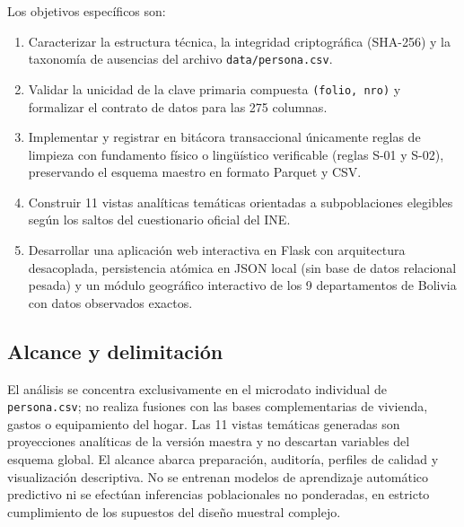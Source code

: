 Los objetivos específicos son:
\begin{enumerate}[leftmargin=0.5in]
  \item Caracterizar la estructura técnica, la integridad criptográfica (SHA-256) y la taxonomía de ausencias del archivo \texttt{data/persona.csv}.
  \item Validar la unicidad de la clave primaria compuesta \texttt{(folio, nro)} y formalizar el contrato de datos para las 275 columnas.
  \item Implementar y registrar en bitácora transaccional únicamente reglas de limpieza con fundamento físico o lingüístico verificable (reglas S-01 y S-02), preservando el esquema maestro en formato Parquet y CSV.
  \item Construir 11 vistas analíticas temáticas orientadas a subpoblaciones elegibles según los saltos del cuestionario oficial del INE.
  \item Desarrollar una aplicación web interactiva en Flask con arquitectura desacoplada, persistencia atómica en JSON local (sin base de datos relacional pesada) y un módulo geográfico interactivo de los 9 departamentos de Bolivia con datos observados exactos.
\end{enumerate}

\subsection{Alcance y delimitación}
El análisis se concentra exclusivamente en el microdato individual de \texttt{persona.csv}; no realiza fusiones con las bases complementarias de vivienda, gastos o equipamiento del hogar. Las 11 vistas temáticas generadas son proyecciones analíticas de la versión maestra y no descartan variables del esquema global. El alcance abarca preparación, auditoría, perfiles de calidad y visualización descriptiva. No se entrenan modelos de aprendizaje automático predictivo ni se efectúan inferencias poblacionales no ponderadas, en estricto cumplimiento de los supuestos del diseño muestral complejo.
